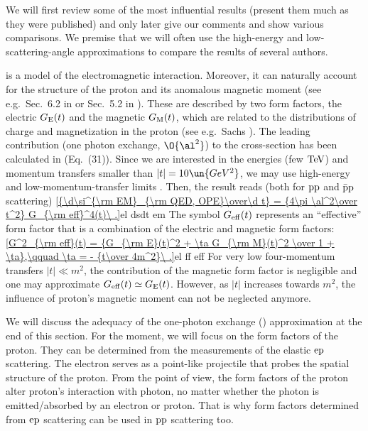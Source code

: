 We will first review some of the most influential results (present them much as they were published) and only later give our comments and show various comparisons. We premise that we will often use the high-energy and low-scattering-angle approximations to compare the results of several authors.



 is a  model of the electromagnetic interaction. Moreover, it can naturally account for the structure of the proton and its anomalous magnetic moment (see e.g.~Sec.~6.2 in  or Sec.~5.2 in ). These are described by two form factors, the electric $G_{\rm E}(t)$ and the magnetic $G_{\rm M}(t)$, which are related to the distributions of charge and magnetization in the proton (see e.g.~Sachs ). The leading contribution (one photon exchange, $\O{\al^2}$) to the cross-section has been calculated in  (Eq.~(31)). Since we are interested in the  energies (few $\rm TeV$) and momentum transfers smaller than $|t| = 10\un{GeV^2}$, we may use high-energy and low-momentum-transfer limits . Then, the result reads (both for $\rm pp$ and $\rm \bar p p$ scattering)
\eqref{{\d\si^{\rm EM}_{\rm QED, OPE}\over\d t} = {4\pi \al^2\over t^2} G_{\rm eff}^4(t)\ .}{el dsdt em}
The symbol $G_{\rm eff}(t)$ represents an ``effective'' form factor that is a combination of the electric and magnetic form factors:
\eqref{G^2_{\rm eff}(t) = {G_{\rm E}(t)^2 + \ta G_{\rm M}(t)^2 \over 1 + \ta},\qquad \ta = - {t\over 4m^2}\ .}{el ff eff}
For very low four-momentum transfers $|t| \ll m^2$, the contribution of the magnetic form factor is negligible and one may approximate $G_{\rm eff}(t) \simeq G_{\rm E}(t)$. However, as $|t|$ increases towards $m^2$, the influence of proton's magnetic moment can not be neglected anymore.

We will discuss the adequacy of the one-photon exchange () approximation at the end of this section. For the moment, we will focus on the form factors of the proton. They can be determined from the measurements of the elastic $\rm ep$ scattering. The electron serves as a point-like projectile that probes the spatial structure of the proton. From the  point of view, the form factors of the proton alter proton's interaction with photon, no matter whether the photon is emitted/absorbed by an electron or proton. That is why form factors determined from $\rm ep$ scattering can be used in $\rm pp$ scattering too.


